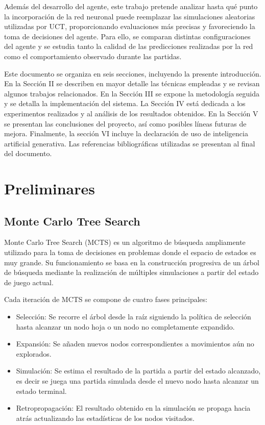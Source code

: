 \documentclass[conference,a4paper]{IEEEtran}
\begin{document}
Además del desarrollo del agente, este trabajo pretende analizar hasta qué punto la incorporación de la red neuronal puede reemplazar las simulaciones aleatorias utilizadas por UCT, proporcionando evaluaciones más precisas y favoreciendo la toma de decisiones del agente. 
Para ello, se comparan distintas configuraciones del agente y se estudia tanto la calidad de las predicciones realizadas por la red como el comportamiento observado durante las partidas. 

Este documento se organiza en seis secciones, incluyendo la presente introducción. 
En la Sección II se describen en mayor detalle las técnicas empleadas y se revisan algunos trabajos relacionados. 
En la Sección III se expone la metodología seguida y se detalla la implementación del sistema. 
La Sección IV está dedicada a los experimentos realizados y al análisis de los resultados obtenidos. 
En la Sección V se presentan las conclusiones del proyecto, así como posibles líneas futuras de mejora. 
Finalmente, la sección VI incluye la declaración de uso de inteligencia artificial generativa. 
Las referencias bibliográficas utilizadas se presentan al final del documento. 

\section{Preliminares} 

\subsection{Monte Carlo Tree Search} 
Monte Carlo Tree Search (MCTS) es un algoritmo de búsqueda ampliamente utilizado para la toma de decisiones en problemas donde el espacio de estados es muy grande. 
Su funcionamiento se basa en la construcción progresiva de un árbol de búsqueda mediante la realización de múltiples simulaciones a partir del estado de juego actual. 

Cada iteración de MCTS se compone de cuatro fases principales: 
\begin{itemize}
\item Selección: Se recorre el árbol desde la raíz siguiendo la política de selección hasta alcanzar un nodo hoja o un nodo no completamente expandido. 
\item Expansión: Se añaden nuevos nodos correspondientes a movimientos aún no explorados. 
\item Simulación: Se estima el resultado de la partida a partir del estado alcanzado, es decir se juega una partida simulada desde el nuevo nodo hasta alcanzar un estado terminal. 
\item Retropropagación: El resultado obtenido en la simulación se propaga hacia atrás actualizando las estadísticas de los nodos visitados. 
\end{itemize}
\end{document}
